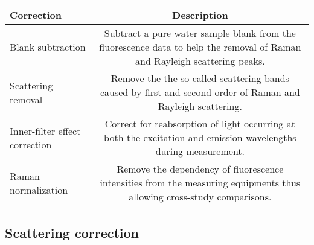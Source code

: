 \documentclass[]{book}
\theoremstyle{definition}
\theoremstyle{definition}
\theoremstyle{remark}
\begin{document}
\begin{longtable}[]{@{}lc@{}}
\toprule
\begin{minipage}[b]{0.25\columnwidth}\raggedright\strut
Correction\strut
\end{minipage} & \begin{minipage}[b]{0.46\columnwidth}\centering\strut
Description\strut
\end{minipage}\tabularnewline
\midrule
\endhead
\begin{minipage}[t]{0.25\columnwidth}\raggedright\strut
Blank subtraction\strut
\end{minipage} & \begin{minipage}[t]{0.46\columnwidth}\centering\strut
Subtract a pure water sample blank from the fluorescence data to help
the removal of Raman and Rayleigh scattering peaks.\strut
\end{minipage}\tabularnewline
\begin{minipage}[t]{0.25\columnwidth}\raggedright\strut
Scattering removal\strut
\end{minipage} & \begin{minipage}[t]{0.46\columnwidth}\centering\strut
Remove the the so-called scattering bands caused by first and second
order of Raman and Rayleigh scattering.\strut
\end{minipage}\tabularnewline
\begin{minipage}[t]{0.25\columnwidth}\raggedright\strut
Inner-filter effect correction\strut
\end{minipage} & \begin{minipage}[t]{0.46\columnwidth}\centering\strut
Correct for reabsorption of light occurring at both the excitation and
emission wavelengths during measurement.\strut
\end{minipage}\tabularnewline
\begin{minipage}[t]{0.25\columnwidth}\raggedright\strut
Raman normalization\strut
\end{minipage} & \begin{minipage}[t]{0.46\columnwidth}\centering\strut
Remove the dependency of fluorescence intensities from the measuring
equipments thus allowing cross-study comparisons.\strut
\end{minipage}\tabularnewline
\bottomrule
\end{longtable}

\subsection{Scattering correction}\label{scattering-correction}
\end{document}
